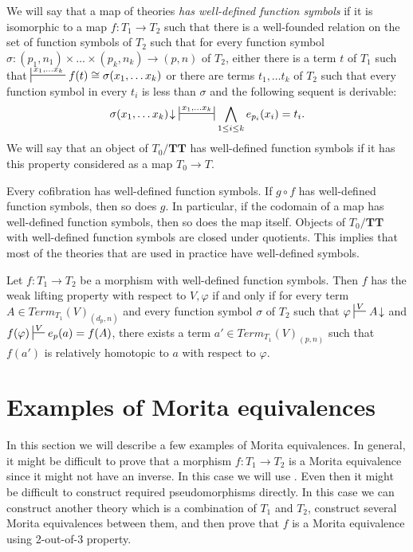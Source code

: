\documentclass[reqno]{amsart}
\theoremstyle{definition}
\theoremstyle{remark}
\newcommand{\cat}[1]{\mathbf{#1}}
\newcommand{\algtt}{\cat{TT}}
\numberwithin{figure}{section}
\begin{document}
We will say that a map of theories \emph{has well-defined function symbols} if it is isomorphic to a map $f : T_1 \to T_2$
such that there is a well-founded relation on the set of function symbols of $T_2$ such that for every function symbol
$\sigma : (p_1,n_1) \times \ldots \times (p_k,n_k) \to (p,n)$ of $T_2$,
either there is a term $t$ of $T_1$ such that $\sststile{}{x_1, \ldots x_k} f(t) \cong \sigma(x_1, \ldots x_k)$ or
there are terms $t_1, \ldots t_k$ of $T_2$ such that every function symbol in every $t_i$ is less than $\sigma$ and the following sequent is derivable:
\[ \sigma(x_1, \ldots x_k)\!\downarrow\ \ssststile{}{x_1, \ldots x_k} \bigwedge_{1 \leq i \leq k} e_{p_i}(x_i) = t_i. \]
We will say that an object of $T_0/\algtt$ has well-defined function symbols if it has this property considered as a map $T_0 \to T$.

Every cofibration has well-defined function symbols.
If $g \circ f$ has well-defined function symbols, then so does $g$.
In particular, if the codomain of a map has well-defined function symbols, then so does the map itself.
Objects of $T_0/\algtt$ with well-defined function symbols are closed under quotients.
This implies that most of the theories that are used in practice have well-defined symbols.

\begin{prop}
Let $f : T_1 \to T_2$ be a morphism with well-defined function symbols.
Then $f$ has the weak lifting property with respect to $V,\varphi$ if and only if
for every term $A \in Term_{T_1}(V)_{(d_p,n)}$ and every function symbol $\sigma$ of $T_2$ such that $\varphi \sststile{}{V} A\!\downarrow$ and $f(\varphi) \sststile{}{V} e_p(a) = f(A)$,
there exists a term $a' \in Term_{T_1}(V)_{(p,n)}$ such that $f(a')$ is relatively homotopic to $a$ with respect to $\varphi$.
\end{prop}

\section{Examples of Morita equivalences}

In this section we will describe a few examples of Morita equivalences.
In general, it might be difficult to prove that a morphism $f : T_1 \to T_2$ is a Morita equivalence since it might not have an inverse.
In this case we will use .
Even then it might be difficult to construct required pseudomorphisms directly.
In this case we can construct another theory which is a combination of $T_1$ and $T_2$, construct several Morita equivalences between them,
and then prove that $f$ is a Morita equivalence using 2-out-of-3 property.
\end{document}
